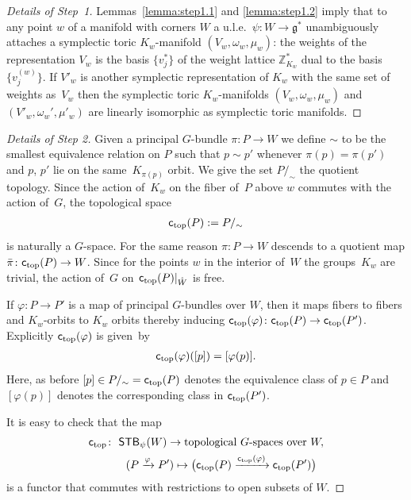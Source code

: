 \documentclass[pdftex]{sigma}
\numberwithin{equation}{section}
\begin{document}
\begin{proof}[Details of Step~1]
Lemmas~\ref{lemma:step1.1} and \ref{lemma:step1.2} imply that to any
point $w$ of a manifold with corners $W$ a u.l.e.\ $\psi\colon W\to {\mathfrak g}^*$
unambiguously attaches a symplectic toric $K_w$-manifold $(V_w,
\omega_w, \mu_w)$: the weights of the representation $V_w$ is the
basis $\{v_j^*\}$ of the weight lattice ${\mathbb Z}_{K_w}^*$ dual to the basis
$\{ v_j^{(w)}\}$.  If $V'_w$ is another symplectic representation of
$K_w$ with the same set of weights as~$V_w$ then the symplectic toric
$K_w$-manifolds $(V_w, \omega_w, \mu_w)$ and $(V'_w, \omega_w',
\mu'_w)$ are linearly isomorphic as symplectic toric manifolds.
\end{proof}


\begin{proof}[Details of Step 2]\sloppy
  Given a principal $G$-bundle $\pi\colon P\to W$ we def\/ine $\sim$ to be the
  smallest equivalence relation on $P$ such that $p\sim p'$ whenever
  $\pi(p) = \pi(p')$ and $p$, $p'$ lie on the same~$K_{\pi(p)}$ orbit.
We give the set $P/_{\sim}$ the quotient topology.  Since the
  action of~$K_w$ on the f\/iber of~$P$ above $w$ commutes with the
  action of~$G$, the topological space
\begin{gather*}
{\textsf{c}_{\rm top}}(P) := P/_{\sim}
\end{gather*}
is naturally a $G$-space.  For
  the same reason $\pi\colon P\to W$ descends to a quotient map
  \mbox{$\bar{\pi}\colon {\textsf{c}_{\rm top}}(P) \to  W$}.  Since for the points $w$ in the interior
  of~$W$ the groups~$K_w$ are trivial, the action of~$G$ on~${\textsf{c}_{\rm top}}
  (P)|_{\mathaccent23{W}}$ is free.


  If $\varphi\colon P\to P'$ is a map of principal $G$-bundles over $W$,
  then it maps f\/ibers to f\/ibers and $K_w$-orbits to $K_w$ orbits
  thereby inducing ${\textsf{c}_{\rm top}}(\varphi)\colon {\textsf{c}_{\rm top}}(P)\to {\textsf{c}_{\rm top}}(P')$.
Explicitly ${\textsf{c}_{\rm top}}(\varphi)$ is given~by
\begin{gather*}%
{\textsf{c}_{\rm top}}(\varphi)([p]) = [\varphi(p)].
\end{gather*}
Here, as before $[p]\in P/_{\sim} = {\textsf{c}_{\rm top}}(P)$ denotes the equivalence
class of $p\in P$ and $ [\varphi(p)]$ denotes the corresponding class
in ${\textsf{c}_{\rm top}}(P')$.

It is easy to check that the map
\begin{gather*}
{\textsf{c}_{\rm top}}\colon \  {\textsf{STB}}_\psi(W) \to \textrm{topological $G$-spaces over }W,\\
\hphantom{{\textsf{c}_{\rm top}}\colon} \
(P\xrightarrow{\varphi}P')\mapsto
\big({\textsf{c}_{\rm top}}(P)\xrightarrow{{\textsf{c}_{\rm top}}(\varphi)}{\textsf{c}_{\rm top}}(P')\big)
\end{gather*}
is a functor that commutes with restrictions to open subsets of $W$.
\end{proof}
\end{document}
